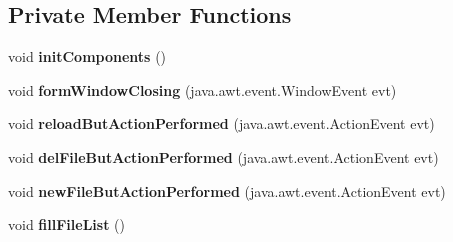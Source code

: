 \subsection*{Private Member Functions}
\begin{DoxyCompactItemize}
\item 
void {\bfseries init\+Components} ()\hypertarget{classsoftmakerjava_1_1_server_acess_window_a17c487bed9b33025000e008bc090b210}{}\label{classsoftmakerjava_1_1_server_acess_window_a17c487bed9b33025000e008bc090b210}

\item 
void {\bfseries form\+Window\+Closing} (java.\+awt.\+event.\+Window\+Event evt)\hypertarget{classsoftmakerjava_1_1_server_acess_window_a2778345682cad85f7dd163498a58d748}{}\label{classsoftmakerjava_1_1_server_acess_window_a2778345682cad85f7dd163498a58d748}

\item 
void {\bfseries reload\+But\+Action\+Performed} (java.\+awt.\+event.\+Action\+Event evt)\hypertarget{classsoftmakerjava_1_1_server_acess_window_a431199141b312e6f39d96225c645fc31}{}\label{classsoftmakerjava_1_1_server_acess_window_a431199141b312e6f39d96225c645fc31}

\item 
void {\bfseries del\+File\+But\+Action\+Performed} (java.\+awt.\+event.\+Action\+Event evt)\hypertarget{classsoftmakerjava_1_1_server_acess_window_a8993db864d7bf095f70127ba4c22eda5}{}\label{classsoftmakerjava_1_1_server_acess_window_a8993db864d7bf095f70127ba4c22eda5}

\item 
void {\bfseries new\+File\+But\+Action\+Performed} (java.\+awt.\+event.\+Action\+Event evt)\hypertarget{classsoftmakerjava_1_1_server_acess_window_a67b8d1cc83b791ee20cf43654fdb1e7e}{}\label{classsoftmakerjava_1_1_server_acess_window_a67b8d1cc83b791ee20cf43654fdb1e7e}

\item 
void {\bfseries fill\+File\+List} ()\hypertarget{classsoftmakerjava_1_1_server_acess_window_a7cadc87f7de1f1c1c7095c59310a1f0f}{}\label{classsoftmakerjava_1_1_server_acess_window_a7cadc87f7de1f1c1c7095c59310a1f0f}

\end{DoxyCompactItemize}
